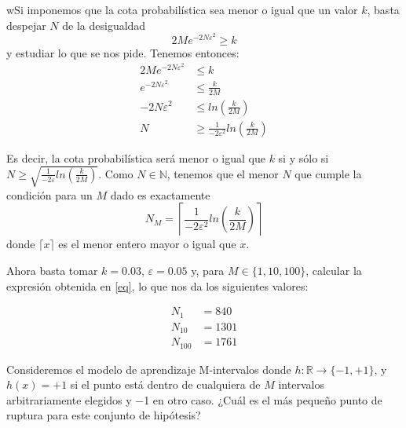\documentclass[a4paper, 11pt]{article}
\begin{document}
    \begin{solucion}
            wSi imponemos que la cota probabilística sea menor o igual que un valor $k$, basta despejar $N$ de la desigualdad
        \[
        2 M e^{-2 N \varepsilon^2} \geq k
        \]
        y estudiar lo que se nos pide. Tenemos entonces:
        \begin{align*}
            2 M e^{-2 N \varepsilon^2} &\leq k \\
            e^{-2 N \varepsilon^2} &\leq \frac{k}{2M} \\
            -2 N \varepsilon^2 &\leq ln(\frac{k}{2M}) \\
            N &\geq \frac{1}{-2\varepsilon^2} ln(\frac{k}{2M})
        \end{align*}

        Es decir, la cota probabilística será menor o igual que $k$ si y sólo si $N \geq \sqrt{\frac{1}{-2\varepsilon} ln(\frac{k}{2M})}$. Como $N \in \mathbb{N}$, tenemos que el menor $N$ que cumple la condición para un $M$ dado es exactamente
        \begin{equation}
            N_M = \left\lceil \frac{1}{-2\varepsilon^2} ln\left(\frac{k}{2M}\right) \right\rceil
            \label{eq}
        \end{equation}
        donde $\lceil x \rceil$ es el menor entero mayor o igual que $x$.

        Ahora basta tomar $k = 0.03$, $\varepsilon = 0.05$ y, para $M \in \{1, 10, 100\}$, calcular la expresión obtenida en \ref{eq}, lo que nos da los siguientes valores:

        \begin{align*}
            N_1 &= 840 \\
            N_{10} &= 1301 \\
            N_{100} &= 1761
        \end{align*}
    \end{solucion}


    \begin{ejercicio}
        Consideremos el modelo de aprendizaje \guillemotleft M-intervalos \guillemotright donde $h \colon \mathbb{R} \to \{−1, +1\}$, y $h(x) = +1$ si el punto está dentro de cualquiera de $M$ intervalos arbitrariamente elegidos y −1 en otro caso. ¿Cuál es el más pequeño punto de ruptura para este conjunto de hipótesis?
    \end{ejercicio}
\end{document}
